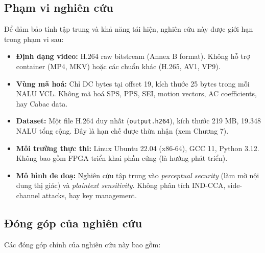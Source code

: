 \subsection{Phạm vi nghiên cứu}

Để đảm bảo tính tập trung và khả năng tái hiện, nghiên cứu này được giới hạn
trong phạm vi sau:

\begin{itemize}
  \item \textbf{Định dạng video:} H.264 raw bitstream (Annex B format). Không
        hỗ trợ container (MP4, MKV) hoặc các chuẩn khác (H.265, AV1, VP9).

  \item \textbf{Vùng mã hoá:} Chỉ DC bytes tại offset 19, kích thước 25 bytes
        trong mỗi NALU VCL. Không mã hoá SPS, PPS, SEI, motion vectors,
        AC coefficients, hay Cabac data.

  \item \textbf{Dataset:} Một file H.264 duy nhất (\texttt{output.h264}),
        kích thước 219 MB, 19.348 NALU tổng cộng. Đây là hạn chế được thừa
        nhận (xem Chương 7).

  \item \textbf{Môi trường thực thi:} Linux Ubuntu 22.04 (x86-64), GCC 11,
        Python 3.12. Không bao gồm FPGA triển khai phần cứng (là hướng phát triển).

  \item \textbf{Mô hình đe doạ:} Nghiên cứu tập trung vào \emph{perceptual security}
        (làm mờ nội dung thị giác) và \emph{plaintext sensitivity}.
        Không phân tích IND-CCA, side-channel attacks, hay key management.
\end{itemize}

\subsection{Đóng góp của nghiên cứu}

Các đóng góp chính của nghiên cứu này bao gồm:

